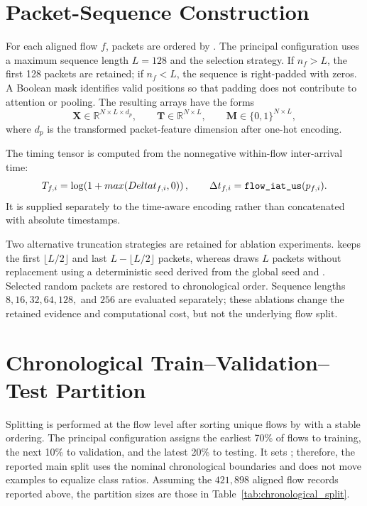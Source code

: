 \documentclass[11pt,fleqn]{report}
\begin{document}
\section{Packet-Sequence Construction}
\label{subsec:sequence_construction}

For each aligned flow $f$, packets are ordered by
. The principal configuration uses a maximum
sequence length $L=128$ and the  selection strategy. If
$n_f>L$, the first 128 packets are retained; if $n_f<L$, the sequence is
right-padded with zeros. A Boolean mask identifies valid positions so that
padding does not contribute to attention or pooling. The resulting arrays have
the forms
\begin{equation}
    \mathbf{X}\in\mathbb{R}^{N\times L\times d_p},\qquad
    \mathbf{T}\in\mathbb{R}^{N\times L},\qquad
    \mathbf{M}\in\{0,1\}^{N\times L},
    \label{eq:stage1_tensor_shapes}
\end{equation}
where $d_p$ is the transformed packet-feature dimension after one-hot
encoding.

The timing tensor is computed from the nonnegative within-flow inter-arrival
time:
\begin{equation}
    T_{f,i}=\log\!\left(1+max(Delta t_{f,i},0)\right),
    \qquad
    \Delta t_{f,i}=\datasetfield{flow_iat_us}(p_{f,i}).
    \label{eq:time_tensor}
\end{equation}
It is supplied separately to the time-aware encoding rather than concatenated
with absolute timestamps.

Two alternative truncation strategies are retained for ablation experiments.
 keeps the first $\lfloor L/2\rfloor$ and last
$L-\lfloor L/2\rfloor$ packets, whereas  draws $L$
packets without replacement using a deterministic seed derived from the global
seed and . Selected random packets are restored to
chronological order. Sequence lengths $8,16,32,64,128,$ and $256$ are evaluated
separately; these ablations change the retained evidence and computational
cost, but not the underlying flow split.

\section{Chronological Train--Validation--Test Partition}
\label{subsec:chronological_partition}

Splitting is performed at the flow level after sorting unique flows by
 with a stable ordering. The principal
configuration assigns the earliest 70\% of flows to training, the next 10\%
to validation, and the latest 20\% to testing. It sets
; therefore, the reported main split uses the
nominal chronological boundaries and does not move examples to equalize class
ratios. Assuming the $421{,}898$ aligned flow records reported above, the
partition sizes are those in Table~\ref{tab:chronological_split}.
\end{document}
